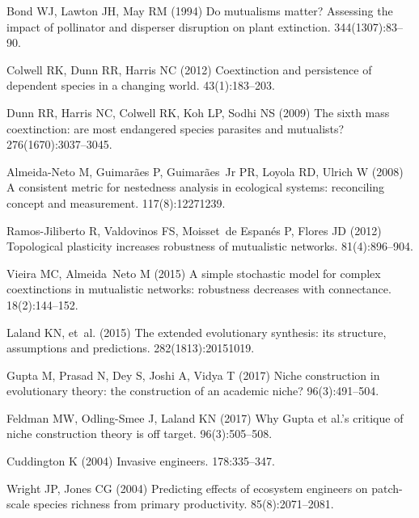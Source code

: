 \documentclass[twocolumn,preprintnumbers,amsmath,amssymb,superscriptaddress]{revtex4}
\begin{document}
\begin{thebibliography}{10}
Bond WJ, Lawton JH, May RM (1994) Do mutualisms matter? {A}ssessing the impact
  of pollinator and disperser disruption on plant extinction.
 344(1307):83--90.

Colwell RK, Dunn RR, Harris NC (2012) Coextinction and persistence of dependent
  species in a changing world.
 43(1):183--203.

Dunn RR, Harris NC, Colwell RK, Koh LP, Sodhi NS (2009) The sixth mass
  coextinction: are most endangered species parasites and mutualists?
 276(1670):3037--3045.

Almeida-Neto M, Guimar{\~a}es P, Guimar{\~a}es~Jr PR, Loyola RD, Ulrich W
  (2008) A consistent metric for nestedness analysis in ecological systems:
  reconciling concept and measurement.
 117(8):1227{\textendash}1239.

Ramos-Jiliberto R, Valdovinos FS, Moisset~de Espanés P, Flores JD (2012)
  Topological plasticity increases robustness of mutualistic networks.
 81(4):896--904.

Vieira MC, Almeida~Neto M (2015) {A simple stochastic model for complex
  coextinctions in mutualistic networks: robustness decreases with
  connectance}.
 18(2):144--152.

Laland KN, et~al. (2015) The extended evolutionary synthesis: its structure,
  assumptions and predictions.
 282(1813):20151019.

Gupta M, Prasad N, Dey S, Joshi A, Vidya T (2017) Niche construction in
  evolutionary theory: the construction of an academic niche?
 96(3):491--504.

Feldman MW, Odling-Smee J, Laland KN (2017) Why {G}upta et al.’s critique of
  niche construction theory is off target.
 96(3):505--508.

Cuddington K (2004) {Invasive engineers}.
 178:335--347.

Wright JP, Jones CG (2004) Predicting effects of ecosystem engineers on
  patch-scale species richness from primary productivity.
 85(8):2071--2081.


\end{thebibliography}
\end{document}
